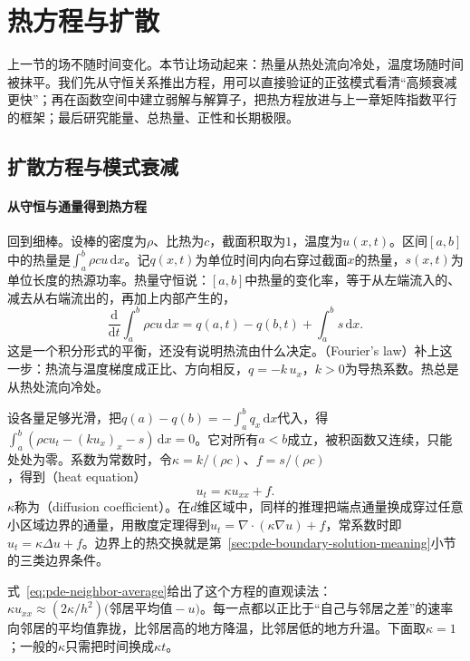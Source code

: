 
\section{热方程与扩散}
\label{sec:pde-heat}

上一节的场不随时间变化。本节让场动起来：热量从热处流向冷处，温度场随时间被抹平。我们先从守恒关系推出方程，用可以直接验证的正弦模式看清“高频衰减更快”；再在函数空间中建立弱解与解算子，把热方程放进与上一章矩阵指数平行的框架；最后研究能量、总热量、正性和长期极限。

\subsection{扩散方程与模式衰减}
\label{sec:pde-heat-modes}

\paragraph{从守恒与通量得到热方程}
回到细棒。设棒的密度为$\rho$、比热为$c$，截面积取为$1$，温度为$u(x,t)$。区间$[a,b]$中的热量是$\int_a^b\rho cu\,\mathrm dx$。记$q(x,t)$为单位时间内向右穿过截面$x$的热量，$s(x,t)$为单位长度的热源功率。热量守恒说：$[a,b]$中热量的变化率，等于从左端流入的、减去从右端流出的，再加上内部产生的，
\[
  \frac{\mathrm d}{\mathrm dt}\int_a^b\rho cu\,\mathrm dx=q(a,t)-q(b,t)+\int_a^bs\,\mathrm dx .
\]
这是一个积分形式的平衡，还没有说明热流由什么决定。（Fourier's law）补上这一步：热流与温度梯度成正比、方向相反，$q=-k\,u_x$，$k>0$为导热系数。热总是从热处流向冷处。

设各量足够光滑，把$q(a)-q(b)=-\int_a^bq_x\,\mathrm dx$代入，得$\int_a^b(\rho cu_t-(ku_x)_x-s)\,\mathrm dx=0$。它对所有$a<b$成立，被积函数又连续，只能处处为零。系数为常数时，令$\kappa=k/(\rho c)$、$f=s/(\rho c)$，得到（heat equation）
\begin{equation}
  u_t=\kappa u_{xx}+f .
  \label{eq:pde-heat-1d}
\end{equation}
$\kappa$称为（diffusion coefficient）。在$d$维区域中，同样的推理把端点通量换成穿过任意小区域边界的通量，用散度定理得到$u_t=\nabla\cdot(\kappa\nabla u)+f$，常系数时即$u_t=\kappa\Delta u+f$。边界上的热交换就是第~\ref{sec:pde-boundary-solution-meaning}小节的三类边界条件。

式~\eqref{eq:pde-neighbor-average}给出了这个方程的直观读法：$\kappa u_{xx}\approx(2\kappa/h^2)\bigl(\text{邻居平均值}-u\bigr)$。每一点都以正比于“自己与邻居之差”的速率向邻居的平均值靠拢，比邻居高的地方降温，比邻居低的地方升温。下面取$\kappa=1$；一般的$\kappa$只需把时间换成$\kappa t$。

